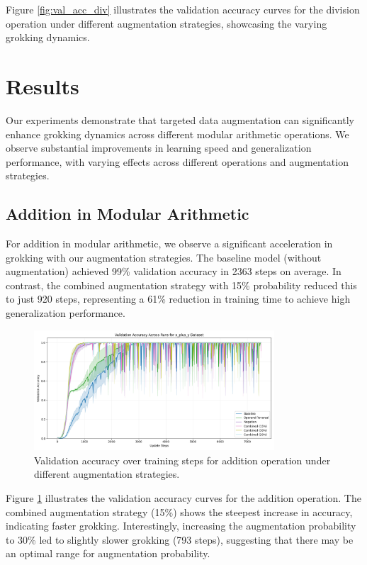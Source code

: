 \documentclass{article} %
\begin{document}
Figure \ref{fig:val_acc_div} illustrates the validation accuracy curves for the division operation under different augmentation strategies, showcasing the varying grokking dynamics.

\section{Results}
\label{sec:results}

Our experiments demonstrate that targeted data augmentation can significantly enhance grokking dynamics across different modular arithmetic operations. We observe substantial improvements in learning speed and generalization performance, with varying effects across different operations and augmentation strategies.

\subsection{Addition in Modular Arithmetic}

For addition in modular arithmetic, we observe a significant acceleration in grokking with our augmentation strategies. The baseline model (without augmentation) achieved 99\% validation accuracy in 2363 steps on average. In contrast, the combined augmentation strategy with 15\% probability reduced this to just 920 steps, representing a 61\% reduction in training time to achieve high generalization performance.

\begin{figure}[h]
    \centering
    \includegraphics[width=0.8\textwidth]{val_acc_x_plus_y.png}
    \caption{Validation accuracy over training steps for addition operation under different augmentation strategies.}
    \label{fig:val_acc_add}
\end{figure}

Figure \ref{fig:val_acc_add} illustrates the validation accuracy curves for the addition operation. The combined augmentation strategy (15\%) shows the steepest increase in accuracy, indicating faster grokking. Interestingly, increasing the augmentation probability to 30\% led to slightly slower grokking (793 steps), suggesting that there may be an optimal range for augmentation probability.
\end{document}
